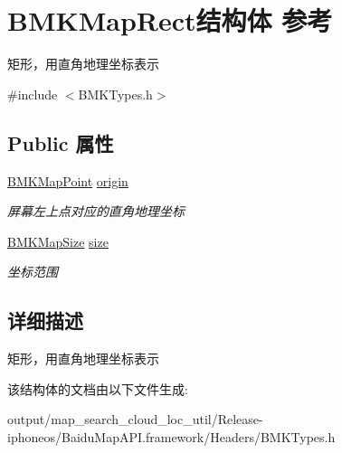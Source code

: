 \hypertarget{struct_b_m_k_map_rect}{}\section{B\+M\+K\+Map\+Rect结构体 参考}
\label{struct_b_m_k_map_rect}


矩形，用直角地理坐标表示  




{\ttfamily \#include $<$B\+M\+K\+Types.\+h$>$}

\subsection*{Public 属性}
\begin{DoxyCompactItemize}
\item 
\hypertarget{struct_b_m_k_map_rect_aeeee8bcaabf5c65e222f1891009325f1}{}\hyperlink{struct_b_m_k_map_point}{B\+M\+K\+Map\+Point} \hyperlink{struct_b_m_k_map_rect_aeeee8bcaabf5c65e222f1891009325f1}{origin}\label{struct_b_m_k_map_rect_aeeee8bcaabf5c65e222f1891009325f1}

\begin{DoxyCompactList}\small\item\em 屏幕左上点对应的直角地理坐标 \end{DoxyCompactList}\item 
\hypertarget{struct_b_m_k_map_rect_ab83b0fb9e6e63b6ab24bdce9ced1e92e}{}\hyperlink{struct_b_m_k_map_size}{B\+M\+K\+Map\+Size} \hyperlink{struct_b_m_k_map_rect_ab83b0fb9e6e63b6ab24bdce9ced1e92e}{size}\label{struct_b_m_k_map_rect_ab83b0fb9e6e63b6ab24bdce9ced1e92e}

\begin{DoxyCompactList}\small\item\em 坐标范围 \end{DoxyCompactList}\end{DoxyCompactItemize}


\subsection{详细描述}
矩形，用直角地理坐标表示 

该结构体的文档由以下文件生成\+:\begin{DoxyCompactItemize}
\item 
output/map\+\_\+search\+\_\+cloud\+\_\+loc\+\_\+util/\+Release-\/iphoneos/\+Baidu\+Map\+A\+P\+I.\+framework/\+Headers/B\+M\+K\+Types.\+h\end{DoxyCompactItemize}
